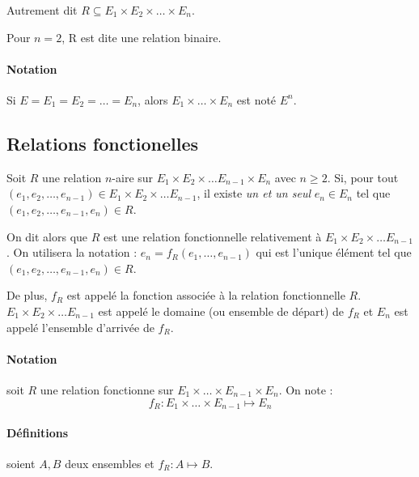 \documentclass[12pt, a4paper]{report}
\begin{document}
Autrement dit $R \subseteq E_1 \times E_2 \times \dots \times E_n$.


Pour $n = 2$, R est dite une relation binaire.

\paragraph{Notation} Si $E = E_1 = E_2 = \dots = E_n$, alors $E_1 \times \dots \times E_n$ est noté $E^{n}$.



\subsection{Relations fonctionelles}

Soit $R$ une relation $n$-aire sur $E_1\times E_2\times\dots
E_{n-1}\times E_n$ avec $n\geq 2$. Si, pour tout
$(e_1,e_2,\dots,e_{n-1})\in E_1\times E_2\times\dots E_{n-1}$, il
existe \textit{un et un seul} $e_n\in E_n$ tel que
$(e_1,e_2,\dots,e_{n-1},e_n) \in R$.

On dit alors que $R$ est une relation fonctionnelle relativement à
$E_1\times E_2\times\dots E_{n-1}$. On utilisera la notation : $e_n =
f_R(e_1,\dots,e_{n-1})$ qui est l'unique élément tel que
$(e_1,e_2,\dots,e_{n-1},e_n)\in R$.

De plus, $f_R$ est appelé la fonction associée à la relation
fonctionnelle $R$. $E_1\times E_2\times\dots E_{n-1}$ est appelé le
domaine (ou ensemble de départ) de $f_R$ et $E_n$ est appelé
l'ensemble d'arrivée de $f_R$.

\paragraph{Notation} soit $R$ une relation fonctionne sur $E_1\times\dots\times E_{n-1}\times E_n$. On note :
\[
f_R : E_1\times\dots\times E_{n-1} \longmapsto E_n
\]

\paragraph{Définitions} soient $A, B$ deux ensembles et $f_R : A\mapsto B$.
\end{document}
